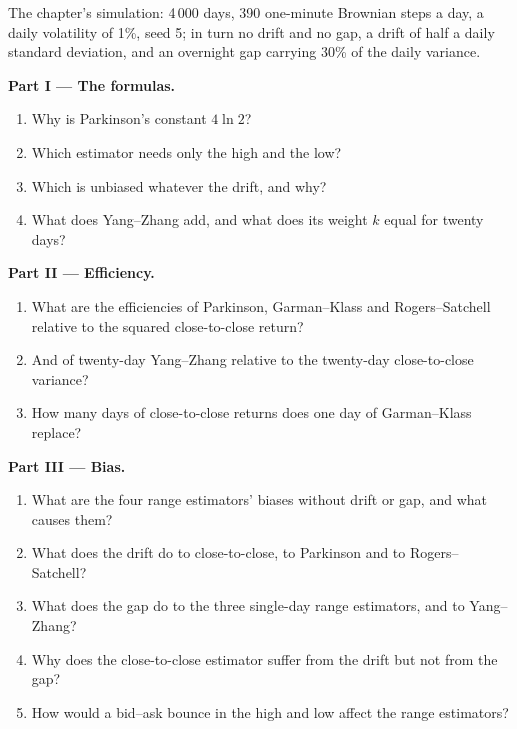 \begin{problem}\label{pb:rs:price-and-volume-features:1}
The chapter's simulation: 4\,000 days, 390 one-minute Brownian steps a day, a daily volatility of 1\%, seed 5; in turn no drift and no
gap, a drift of half a daily standard deviation, and an overnight gap carrying 30\% of the daily variance.

\medskip\noindent\textbf{Part I --- The formulas.}
\begin{enumerate}
\item Why is Parkinson's constant $4\ln2$?
\item Which estimator needs only the high and the low?
\item Which is unbiased whatever the drift, and why?
\item What does Yang--Zhang add, and what does its weight $k$ equal for twenty days?
\end{enumerate}

\medskip\noindent\textbf{Part II --- Efficiency.}
\begin{enumerate}[resume]
\item What are the efficiencies of Parkinson, Garman--Klass and Rogers--Satchell relative to the squared close-to-close return?
\item And of twenty-day Yang--Zhang relative to the twenty-day close-to-close variance?
\item How many days of close-to-close returns does one day of Garman--Klass replace?
\end{enumerate}

\medskip\noindent\textbf{Part III --- Bias.}
\begin{enumerate}[resume]
\item What are the four range estimators' biases without drift or gap, and what causes them?
\item What does the drift do to close-to-close, to Parkinson and to Rogers--Satchell?
\item What does the gap do to the three single-day range estimators, and to Yang--Zhang?
\item Why does the close-to-close estimator suffer from the drift but not from the gap?
\item How would a bid--ask bounce in the high and low affect the range estimators?
\end{enumerate}


\end{problem}
